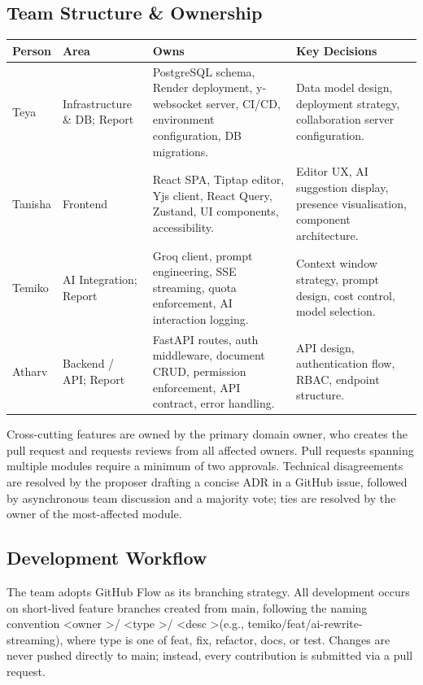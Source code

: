\documentclass{article}
\begin{document}
\subsection{Team Structure \& Ownership}
\noindent
{\small
\begin{tabularx}{\textwidth}{|>{\hsize=0.4\hsize\raggedright\arraybackslash}X|>{\hsize=0.4\hsize\raggedright\arraybackslash}X|>{\hsize=0.6\hsize\raggedright\arraybackslash}X|>{\hsize=0.6\hsize\raggedright\arraybackslash}X|}
    \hline
    \rowcolor{tableBlue}
    \textbf{\color{white}Person} &
    \textbf{\color{white}Area} &
    \textbf{\color{white}Owns} &
    \textbf{\color{white}Key Decisions} \\
    \hline
    Teya & Infrastructure \& DB; Report & PostgreSQL schema, Render deployment, y-websocket server, CI/CD, environment configuration, DB migrations. & Data model design, deployment strategy, collaboration server configuration. \\
    \hline
    Tanisha & Frontend & React SPA, Tiptap editor, Yjs client, React Query, Zustand, UI components, accessibility. & Editor UX, AI suggestion display, presence visualisation, component architecture. \\
    \hline
    Temiko & AI Integration; Report & Groq client, prompt engineering, SSE streaming, quota enforcement, AI interaction logging. & Context window strategy, prompt design, cost control, model selection. \\
    \hline
    Atharv & Backend / API; Report & FastAPI routes, auth middleware, document CRUD, permission enforcement, API contract, error handling. & API design, authentication flow, RBAC, endpoint structure. \\
    \hline
\end{tabularx}
}
\vspace{5pt}


\noindent Cross-cutting features are owned by the primary domain owner, who creates the pull request and requests reviews from all affected owners. Pull requests spanning multiple modules require a minimum of two approvals. Technical disagreements are resolved by the proposer drafting a concise ADR in a GitHub issue, followed by asynchronous team discussion and a majority vote; ties are resolved by the owner of the most-affected module.




\subsection{Development Workflow}
The team adopts GitHub Flow as its branching strategy. All development occurs on short-lived feature branches created from main, following the naming convention \textless owner \textgreater / \textless type \textgreater / \textless desc \textgreater(e.g., temiko/feat/ai-rewrite-streaming), where type is one of feat, fix, refactor, docs, or test. Changes are never pushed directly to main; instead, every contribution is submitted via a pull request.
\end{document}
